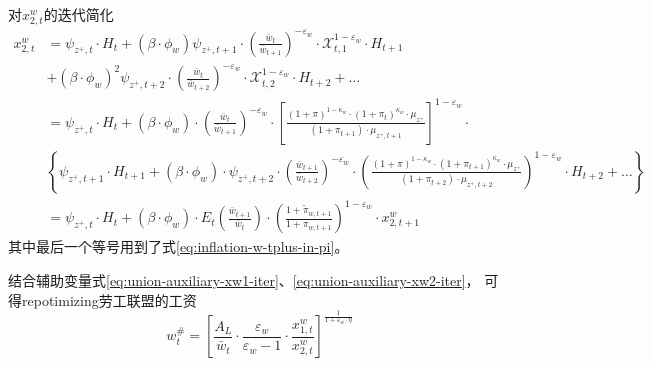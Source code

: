 对$x_{2,t}^{w}$的迭代简化
\begin{align}
\label{eq:union-auxiliary-xw2-iter}
x_{2,t}^{w} &= \psi_{z^+,t} \cdot H_t + \left(\beta \cdot \phi_w\right) \psi_{z^+,t+1} \cdot \left(\frac{\bar{w}_{t}}{\bar{w}_{t+1}}\right)^{-\varepsilon_w} \cdot \mathcal{X}_{t,1}^{1-\varepsilon_w} \cdot H_{t+1} \nonumber \\
&+ \left(\beta \cdot \phi_w\right)^2 \psi_{z^+,t+2} \cdot \left(\frac{\bar{w}_{t}}{\bar{w}_{t+2}}\right)^{-\varepsilon_w} \cdot \mathcal{X}_{t,2}^{1-\varepsilon_w} \cdot H_{t+2} + \ldots \nonumber \\
&=\psi_{z^+,t}\cdot H_t + \left(\beta \cdot \phi_w\right) \cdot  \left(\frac{\bar{w}_{t}}{\bar{w}_{t+1}}\right)^{-\varepsilon_w}
\cdot \left[\frac{(1+\pi)^{1-\kappa_w} \cdot (1+\pi_t)^{\kappa_w} \cdot \mu_{z^+}}{(1+\pi_{t+1}) \cdot \mu_{z^+,t+1}}\right]^{1-\varepsilon_w} \cdot \nonumber \\
             &\left\{
               \psi_{z^+,t+1} \cdot H_{t+1} + \left(\beta \cdot \phi_w\right) \cdot \psi_{z^+,t+2} \cdot \left(\frac{\bar{w}_{t+1}}{\bar{w}_{t+2}}\right)^{-\varepsilon_w} \cdot
\left(\frac{(1+\pi)^{1-\kappa_w} \cdot (1+\pi_{t+1})^{\kappa_w} \cdot \mu_{z^+}}{(1+\pi_{t+2}) \cdot \mu_{z^+,t+2}}\right)^{1-\varepsilon_w} \cdot H_{t+2} + \ldots
 \right\} \nonumber \\
&= \psi_{z^+,t} \cdot H_t + \left(\beta \cdot \phi_w\right) \cdot E_t \left(\frac{\bar{w}_{t+1}}{\bar{w}_{t}}\right) \cdot \left(
  \frac{
  1+\tilde{\pi}_{w,t+1}
  }{
  1+ \pi_{w,t+1}
  }
  \right)^{1-\varepsilon_w} \cdot x_{2,t+1}^{w}
\end{align}
其中最后一个等号用到了式\eqref{eq:inflation-w-tplus-in-pi}。

结合辅助变量式\eqref{eq:union-auxiliary-xw1-iter}、\eqref{eq:union-auxiliary-xw2-iter}， 可得repotimizing劳工联盟的工资
\begin{equation}
  \label{eq:union-repotimizing-wage}
  w_t^{\#} = \left[
    \frac{A_L}{\bar{w}_{t}} \cdot \frac{\varepsilon_w}{\varepsilon_w -1} \cdot \frac{x_{1,t}^{w}}{x_{2,t}^w}
  \right]^{\frac{1}{1+\varepsilon_w \cdot \eta}}
\end{equation}

